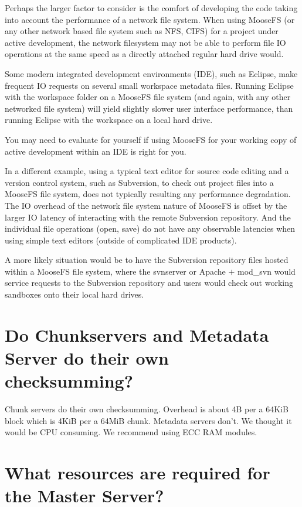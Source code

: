 \documentclass[a4paper,11pt,english]{report}
\begin{document}
		Perhaps the larger factor to consider is the comfort of developing the code taking into account the performance of a network file system. When using MooseFS (or any other network based file system such as NFS, CIFS) for a project under active development, the network filesystem may not be able to perform file IO operations at the same speed as a directly attached regular hard drive would.
		
		Some modern integrated development environments (IDE), such as Eclipse, make frequent IO requests on several small workspace metadata files. Running Eclipse with the workspace folder on a MooseFS file system (and again, with any other networked file system) will yield slightly slower user interface performance, than running Eclipse with the workspace on a local hard drive. 
		
		You may need to evaluate for yourself if using MooseFS for your working copy of active development within an IDE is right for you.
		
		In a different example, using a typical text editor for source code editing and a version control system, such as Subversion, to check out project files into a MooseFS file system, does not typically resulting any performance degradation. The IO overhead of the network file system nature of MooseFS is offset by the larger IO latency of interacting with the remote Subversion repository. And the individual file operations (open, save) do not have any observable latencies when using simple text editors (outside of complicated IDE products).
		
		A more likely situation would be to have the Subversion repository files hosted within a MooseFS file system, where the svnserver or Apache $+$ mod\_svn would service requests to the Subversion repository and users would check out working sandboxes onto their local hard drives.
		
		
		\section{Do Chunkservers and Metadata Server do their own checksumming?}
		
		Chunk servers do their own checksumming. Overhead is about 4B per a 64KiB block which is 4KiB per a 64MiB chunk.
		Metadata servers don't. We thought it would be CPU consuming. We recommend using ECC RAM modules.		
		
		\section{What resources are required for the Master Server?}
		
\end{document}
